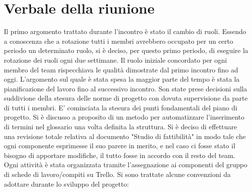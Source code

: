 \section{Verbale della riunione}

Il primo argomento trattato durante l'incontro è stato il cambio di ruoli.
Essendo a conoscenza che a rotazione tutti i membri avrebbero occupato per un certo periodo un determinato ruolo, si è deciso, per questo primo periodo, di eseguire la rotazione dei ruoli ogni due settimane. Il ruolo iniziale concordato per ogni membro del team rispecchiava le qualità dimostrate dal primo incontro fino ad oggi.
\newline \newline
L'argomento sul quale è stata spesa la maggior parte del tempo è stata la pianificazione del lavoro fino al successivo incontro. Son state prese decisioni sulla suddivione della stesura delle norme di progetto con dovuta supervisione da parte di tutti i membri. E' cominciata la stesura dei punti fondamentali del piano di progetto. Si è discusso a proposito di un metodo per automatizzare l'inserimento di termini nel glossario una volta definita la struttura. Si è deciso di effettuare una revisione totale relativa al documento "Studio di fattibilità" in modo tale che ogni componente esprimesse il suo parere in merito, e nel caso ci fosse stato il bisogno di apportare modifiche, il tutto fosse in accordo con il resto del team. Ogni attività è stata organizzata tramite l'assegnazione ai componenti del gruppo di schede di lavoro/compiti su Trello. 
\newline \newline \newline \newline \newline
Si sono trattate alcune convenzioni da adottare durante lo sviluppo del progetto:
